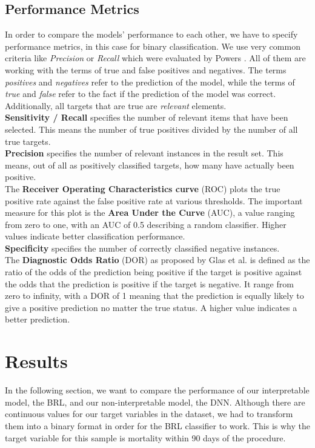 \documentclass[conference,comsoc]{IEEEtran}
\begin{document}
\subsection{Performance Metrics}
In order to compare the models' performance to each other, we have to specify performance metrics, in this case for binary classification.
We use very common criteria like \emph{Precision} or \emph{Recall} which were evaluated by Powers \cite{powers2011evaluation}.
All of them are working with the terms of true and false positives and negatives.
The terms \emph{positives} and \emph{negatives} refer to the prediction of the model, while the terms of \emph{true} and \emph{false} refer to the fact if the prediction of the model was correct.
Additionally, all targets that are true are \emph{relevant} elements. \\
\textbf{Sensitivity / Recall} specifies the number of relevant items that have been selected.
This means the number of true positives divided by the number of all true targets. \\
\textbf{Precision} specifies the number of relevant instances in the result set.
This means, out of all as positively classified targets, how many have actually been positive. \\
The \textbf{Receiver Operating Characteristics curve} (ROC) plots the true positive rate against the false positive rate at various thresholds.
The important measure for this plot is the \textbf{Area Under the Curve} (AUC), a value ranging from zero to one, with an AUC of 0.5 describing a random classifier.
Higher values indicate better classification performance. \\
\textbf{Specificity} specifies the number of correctly classified negative instances. \\
The \textbf{Diagnostic Odds Ratio} (DOR) as proposed by Glas et al.\cite{glas2003diagnostic} is defined as the ratio of the odds of the prediction being positive if the target is positive against the odds that the prediction is positive if the target is negative.
It range from zero to infinity, with a DOR of 1 meaning that the prediction is equally likely to give a positive prediction no matter the true status.
A higher value indicates a better prediction.


\section{Results}
\label{sec:results}
In the following section, we want to compare the performance of our interpretable model, the BRL, and our non-interpretable model, the DNN.
Although there are continuous values for our target variables in the dataset, we had to transform them into a binary format in order for the BRL classifier to work.
This is why the target variable for this sample is mortality within 90 days of the procedure.
\end{document}
